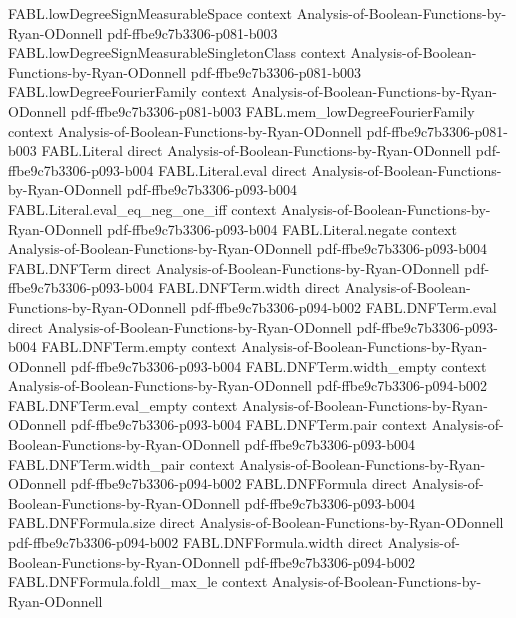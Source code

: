 \begin{theorem}
\proofstep
  {FABL.lowDegreeSignMeasurableSpace}
  {context}
  {Analysis-of-Boolean-Functions-by-Ryan-ODonnell}
  {pdf-ffbe9c7b3306-p081-b003}
\proofstep
  {FABL.lowDegreeSignMeasurableSingletonClass}
  {context}
  {Analysis-of-Boolean-Functions-by-Ryan-ODonnell}
  {pdf-ffbe9c7b3306-p081-b003}
\proofstep
  {FABL.lowDegreeFourierFamily}
  {context}
  {Analysis-of-Boolean-Functions-by-Ryan-ODonnell}
  {pdf-ffbe9c7b3306-p081-b003}
\proofstep
  {FABL.mem_lowDegreeFourierFamily}
  {context}
  {Analysis-of-Boolean-Functions-by-Ryan-ODonnell}
  {pdf-ffbe9c7b3306-p081-b003}
\proofstep
  {FABL.Literal}
  {direct}
  {Analysis-of-Boolean-Functions-by-Ryan-ODonnell}
  {pdf-ffbe9c7b3306-p093-b004}
\proofstep
  {FABL.Literal.eval}
  {direct}
  {Analysis-of-Boolean-Functions-by-Ryan-ODonnell}
  {pdf-ffbe9c7b3306-p093-b004}
\proofstep
  {FABL.Literal.eval_eq_neg_one_iff}
  {context}
  {Analysis-of-Boolean-Functions-by-Ryan-ODonnell}
  {pdf-ffbe9c7b3306-p093-b004}
\proofstep
  {FABL.Literal.negate}
  {context}
  {Analysis-of-Boolean-Functions-by-Ryan-ODonnell}
  {pdf-ffbe9c7b3306-p093-b004}
\proofstep
  {FABL.DNFTerm}
  {direct}
  {Analysis-of-Boolean-Functions-by-Ryan-ODonnell}
  {pdf-ffbe9c7b3306-p093-b004}
\proofstep
  {FABL.DNFTerm.width}
  {direct}
  {Analysis-of-Boolean-Functions-by-Ryan-ODonnell}
  {pdf-ffbe9c7b3306-p094-b002}
\proofstep
  {FABL.DNFTerm.eval}
  {direct}
  {Analysis-of-Boolean-Functions-by-Ryan-ODonnell}
  {pdf-ffbe9c7b3306-p093-b004}
\proofstep
  {FABL.DNFTerm.empty}
  {context}
  {Analysis-of-Boolean-Functions-by-Ryan-ODonnell}
  {pdf-ffbe9c7b3306-p093-b004}
\proofstep
  {FABL.DNFTerm.width_empty}
  {context}
  {Analysis-of-Boolean-Functions-by-Ryan-ODonnell}
  {pdf-ffbe9c7b3306-p094-b002}
\proofstep
  {FABL.DNFTerm.eval_empty}
  {context}
  {Analysis-of-Boolean-Functions-by-Ryan-ODonnell}
  {pdf-ffbe9c7b3306-p093-b004}
\proofstep
  {FABL.DNFTerm.pair}
  {context}
  {Analysis-of-Boolean-Functions-by-Ryan-ODonnell}
  {pdf-ffbe9c7b3306-p093-b004}
\proofstep
  {FABL.DNFTerm.width_pair}
  {context}
  {Analysis-of-Boolean-Functions-by-Ryan-ODonnell}
  {pdf-ffbe9c7b3306-p094-b002}
\proofstep
  {FABL.DNFFormula}
  {direct}
  {Analysis-of-Boolean-Functions-by-Ryan-ODonnell}
  {pdf-ffbe9c7b3306-p093-b004}
\proofstep
  {FABL.DNFFormula.size}
  {direct}
  {Analysis-of-Boolean-Functions-by-Ryan-ODonnell}
  {pdf-ffbe9c7b3306-p094-b002}
\proofstep
  {FABL.DNFFormula.width}
  {direct}
  {Analysis-of-Boolean-Functions-by-Ryan-ODonnell}
  {pdf-ffbe9c7b3306-p094-b002}
\proofstep
  {FABL.DNFFormula.foldl_max_le}
  {context}
  {Analysis-of-Boolean-Functions-by-Ryan-ODonnell}

\end{theorem}
